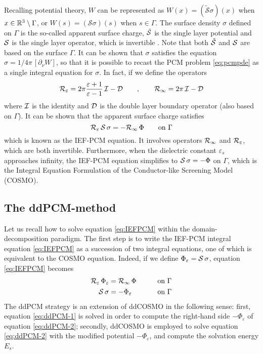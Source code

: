 Recalling potential theory, $W$ can be represented as $W(x) = (\tilde{\mathcal{S}}\sigma)(x)$ when $x \in \mathbb{R}^3 \setminus \Gamma$, or $W(s) = (\mathcal{S}\sigma)(s)$ when $s \in \Gamma$. 
The surface density $\sigma$ defined on $\Gamma$ is the so-called apparent surface charge,  $\tilde{\mathcal{S}}$ is the single layer potential and $\mathcal{S}$ is the single layer operator,  which is invertible \cite{Calderon}. 
Note that both $\tilde{\mathcal{S}}$ and $\mathcal{S}$ are based on the surface $\Gamma$.
It can be shown that $\sigma$ satisfies the equation $\sigma = 1/4\pi \, [ \partial_\nu W]$, so that it is possible to recast the PCM problem \eqref{eq:pcmpde} as a single integral equation for $\sigma$. In fact, if we define the operators 
\begin{equation}
 \label{eq:Reps}
 \mathcal{R}_\varepsilon = 2\pi \frac{\varepsilon+1}{\varepsilon-1} \, \mathcal{I} - \mathcal{D} \qquad, \qquad \mathcal{R}_\infty = 2\pi \, \mathcal{I} - \mathcal{D}
\end{equation}
where $\mathcal{I}$ is the identity and $\mathcal{D}$ is the double layer boundary operator (also based on $\Gamma$).
It can be shown\cite{ReviewPCM_2005} that the apparent surface charge satisfies
\begin{equation}
\label{eq:IEFPCM}
\mathcal{R}_\varepsilon \, \mathcal{S} \, \sigma = - \mathcal{R}_\infty \, \Phi \qquad \text{on }\Gamma
\end{equation}
which is known as the IEF-PCM equation. It involves operators $\mathcal{R}_\infty$ and $\mathcal{R}_\varepsilon$, which are both invertible. Furthermore, when the dielectric constant $\varepsilon_s$ approaches infinity, the IEF-PCM equation simplifies to $\mathcal{S} \, \sigma = - \Phi$ on $\Gamma$, which is the Integral Equation Formulation of the Conductor-like Screening Model (COSMO)\cite{Lipparini_JCP_VPCM}.


\subsection{The ddPCM-method}


Let us recall how to solve equation \eqref{eq:IEFPCM} within the domain-decomposition paradigm. The first step is to write the IEF-PCM integral equation \eqref{eq:IEFPCM} as a succession of two integral equations, one of which is equivalent to the COSMO equation\cite{Cances_Librone_PCM}. Indeed, if we define $\Phi_\varepsilon = \mathcal{S} \, \sigma$, equation \eqref{eq:IEFPCM} becomes
\begin{alignat}{3}
\mathcal{R}_\varepsilon \, \Phi_\varepsilon & = \mathcal{R}_\infty \, \Phi \qquad && \text{on }\Gamma  \label{eq:ddPCM-1} \\
\mathcal{S} \, \sigma & = -\Phi_\varepsilon  && \text{on }\Gamma \label{eq:ddPCM-2} 
\end{alignat}
The ddPCM strategy is an extension of ddCOSMO in the following sense: first, equation \eqref{eq:ddPCM-1} is solved in order to compute the right-hand side $-\Phi_\varepsilon$ of equation \eqref{eq:ddPCM-2}; secondly, ddCOSMO is employed to solve equation \eqref{eq:ddPCM-2} with the modified potential $-\Phi_\varepsilon$, and compute the solvation energy $E_s$.

